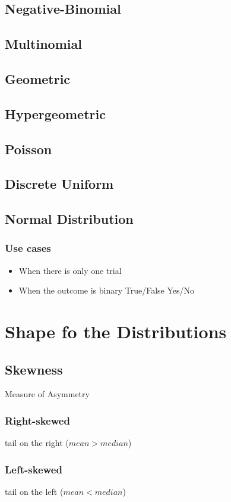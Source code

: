 \documentclass[12pt]{extarticle}
\begin{document}
\subsection{Negative-Binomial}
\subsection{Multinomial}
\subsection{Geometric}
\subsection{Hypergeometric}
\subsection{Poisson}
\subsection{Discrete Uniform}
\subsection{Normal Distribution}


\subsubsection{Use cases}
\begin{itemize}
    \item When there is only one trial
    \item When the outcome is binary True/False Yes/No 
\end{itemize}




\section{Shape fo the Distributions}
\subsection{Skewness} 
Measure of Asymmetry  
\subsubsection{Right-skewed} 
tail on the right (\(mean > median\)) 

\subsubsection{Left-skewed}
tail on the left (\(mean < median\))
\end{document}
